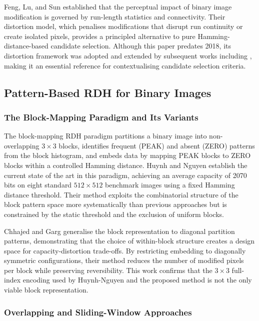 \documentclass[a4paper,fleqn]{cas-dc}
\begin{document}
Feng, Lu, and Sun \cite{Feng2015Secure} established that the perceptual impact of binary image modification is governed by run-length statistics and connectivity. Their distortion model, which penalises modifications that disrupt run continuity or create isolated pixels, provides a principled alternative to pure Hamming-distance-based candidate selection. Although this paper predates 2018, its distortion framework was adopted and extended by subsequent works including \cite{Dong2020Adaptive, Zhang2022Magnification, Yin2020PPOCP}, making it an essential reference for contextualising candidate selection criteria.

\subsection{Pattern-Based RDH for Binary Images}

\subsubsection{The Block-Mapping Paradigm and Its Variants}

The block-mapping RDH paradigm partitions a binary image into non-overlapping $3\times3$ blocks, identifies frequent (PEAK) and absent (ZERO) patterns from the block histogram, and embeds data by mapping PEAK blocks to ZERO blocks within a controlled Hamming distance. Huynh and Nguyen \cite{Huynh2025BlockMapping} establish the current state of the art in this paradigm, achieving an average capacity of 2070 bits on eight standard $512\times512$ benchmark images using a fixed Hamming distance threshold. Their method exploits the combinatorial structure of the block pattern space more systematically than previous approaches but is constrained by the static threshold and the exclusion of uniform blocks.

Chhajed and Garg \cite{Chhajed2023BlockDiagonal} generalise the block representation to diagonal partition patterns, demonstrating that the choice of within-block structure creates a design space for capacity-distortion trade-offs. By restricting embedding to diagonally symmetric configurations, their method reduces the number of modified pixels per block while preserving reversibility. This work confirms that the $3\times3$ full-index encoding used by Huynh-Nguyen and the proposed method is not the only viable block representation.

\subsubsection{Overlapping and Sliding-Window Approaches}
\end{document}
